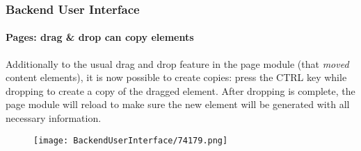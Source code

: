 \begin{frame}[fragile]
	\frametitle{Backend User Interface}
	\framesubtitle{Pages: drag \& drop can copy elements}

	Additionally to the usual drag and drop feature in the page module (that \textit{moved} content elements),
	it is now possible to create copies: press the CTRL key while dropping to create a copy of the dragged
	element. After dropping is complete, the page module will reload to make sure the new element will be
	generated with all necessary information.

	\begin{figure}
		\texttt{[image: BackendUserInterface/74179.png]}
	\end{figure}

\end{frame}


